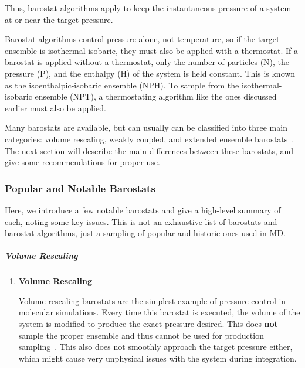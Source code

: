 \documentclass[9pt,bestpractices]{livecoms}
\begin{document}
Thus, barostat algorithms apply to keep the instantaneous pressure of a system at or near the target pressure.

Barostat algorithms control pressure alone, not temperature, so if the target ensemble is isothermal-isobaric, they must also be applied with a thermostat.
If a barostat is applied without a thermostat, only the number of particles (N), the pressure (P), and the enthalpy (H) of the system is held constant.
This is known as the isoenthalpic-isobaric ensemble (NPH).
To sample from the isothermal-isobaric ensemble (NPT), a thermostating algorithm like the ones discussed earlier must also be applied.

Many barostats are available, but can usually can be classified into three main categories: volume rescaling, weakly coupled, and extended ensemble barostats~\cite{ShellNotes, tuckermanBook}. 
The next section will describe the main differences between these barostats, and give some recommendations for proper use.


\subsubsection{Popular and Notable Barostats}
Here, we introduce a few notable barostats and give a high-level summary of each, noting some key issues.
This is not an exhaustive list of barostats and barostat algorithms, just a sampling of popular and historic ones used in MD\@.

\subparagraph{Volume Rescaling}
\begin{enumerate}[listparindent=\parindent]
    \item \textbf{Volume Rescaling}

Volume rescaling barostats are the simplest example of pressure control in molecular simulations.
Every time this barostat is executed, the volume of the system is modified to produce the exact pressure desired.
This does \textbf{not} sample the proper ensemble and thus cannot be used for production sampling~\cite{ShellNotes}.
This also does not smoothly approach the target pressure either, which might cause very unphysical issues with the system during integration.

\end{enumerate}
\end{document}

